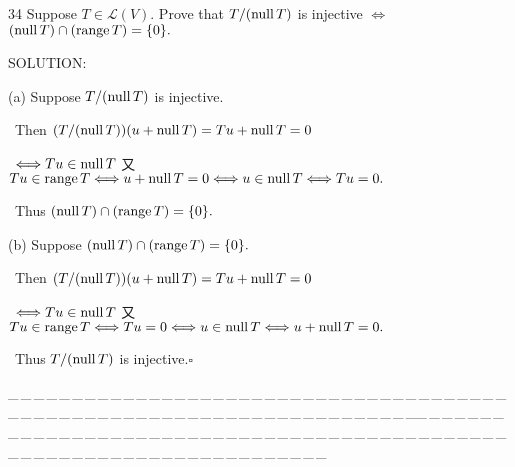 \documentclass[a4paper, 11pt, UTF8]{article}
\def\range{\textup{range}\,}
\def\null{\textup{null\,}}
\def\Lm{\mathcal{L}}
\begin{document}
\begin{large}
{\timesbf\Large 34} {\timessl\Large 
Suppose $T\in\Lm(V).$ Prove that $T/(\null T)$ is injective $\Longleftrightarrow$ $(\null T)\cap(\range T)=\{0\}.$
}\par
{\timesbf S\footnotesize{OLUTION:}}\par\quad
(a) Suppose $T/(\null T)$ is injective.\par\qquad\,
Then $(T/(\null T))(u+\null T)=Tu+\null T=0$\par\qquad\,
$\Longleftrightarrow Tu\in\null T$ 又 $Tu\in\range T\Longleftrightarrow u+\null T=0\Longleftrightarrow u\in\null T\Longleftrightarrow Tu=0.$\par\qquad\,
Thus $(\null T)\cap(\range T)=\{0\}.$\par\quad
(b) Suppose $(\null T)\cap(\range T)=\{0\}.$\par\qquad\,
Then $(T/(\null T))(u+\null T)=Tu+\null T=0$\par\qquad\,
$\Longleftrightarrow Tu\in\null T$ 又 $Tu\in\range T\Longleftrightarrow Tu=0\Longleftrightarrow u\in\null T\Longleftrightarrow u+\null T=0.$\par\qquad\,
Thus $T/(\null T)$ is injective.\quad$\square$\par
{\tiny \_\,\_\,\_\,\_\,\_\,\_\,\_\,\_\,\_\,\_\,\_\,\_\,\_\,\_\,\_\,\_\,\_\,\_\,\_\,\_\,\_\,\_\,\_\,\_\,\_\,\_\,\_\,\_\,\_\,\_\,\_\,\_\,\_\,\_\,\_\,\_\,\_\,\_\,\_\,\_\,\_\,\_\,\_\,\_\,\_\,\_\,\_\,\_\,\_\,\_\,\_\,\_\,\_\,\_\,\_\,\_\,\_\,\_\,\_\,\_\,\_\,\_\,\_\,\_\,\_\,\_\,\_\,\_\,\_\,\_\,\_\_\,\_\,\_\,\_\,\_\,\_\,\_\,\_\,\_\,\_\,\_\,\_\,\_\,\_\,\_\,\_\,\_\,\_\,\_\,\_\,\_\,\_\,\_\,\_\,\_\,\_\,\_\,\_\,\_\,\_\,\_\,\_\,\_\,\_\,\_\,\_\,\_\,\_\,\_\,\_\,\_\,\_\,\_\,\_\,\_\,\_\,\_\,\_\,\_\,\_\,\_\,\_\,\_\,\_\,\_\,\_\,\_\,\_\,\_\,\_\,\_\,\_\,\_\,\_\,\_\,\_\,\_\,\_\,\_\,\_\,\_}\par

\par


\end{large}
\end{document}
